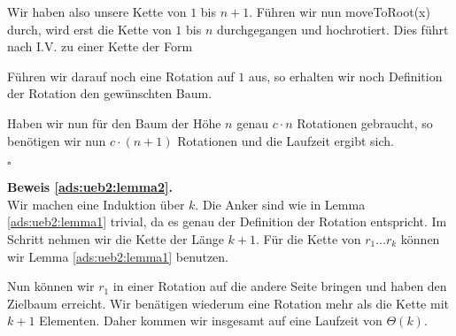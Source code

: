 \documentclass[11pt,a4paper,ngerman]{article}
\begin{document}
Wir haben also unsere Kette von $1$ bis $n+1$. Führen wir nun moveToRoot(x) durch, wird erst die Kette von $1$ bis $n$ durchgegangen und hochrotiert.
Dies führt nach I.V. zu einer Kette der Form 

   \begin{center}
   \end{center}

Führen wir darauf noch eine Rotation auf $1$ aus, so erhalten wir noch Definition der Rotation den gewünschten Baum.

Haben wir nun für den Baum der Höhe $n$ genau $c \cdot n$ Rotationen gebraucht, so benötigen wir nun $c \cdot (n+1)$ Rotationen und die Laufzeit ergibt sich.

\mbox{}\hfill$\square$

\noindent\textbf{Beweis \ref{ads:ueb2:lemma2}.}\\
Wir machen eine Induktion über $k$. Die Anker sind wie in Lemma \ref{ads:ueb2:lemma1} trivial, da es genau der Definition der Rotation entspricht. Im Schritt
nehmen wir die Kette der Länge $k+1$. Für die Kette von $r_1 \ldots r_k$ können wir Lemma \ref{ads:ueb2:lemma1} benutzen.
 
      \begin{center}  
      \end{center} 
Nun können wir $r_1$ in einer Rotation auf die andere Seite bringen und haben den Zielbaum erreicht. Wir benätigen wiederum eine Rotation mehr als die Kette mit $k+1$ Elementen. Daher kommen wir insgesamt auf eine Laufzeit von $\Theta(k)$.
\end{document}
